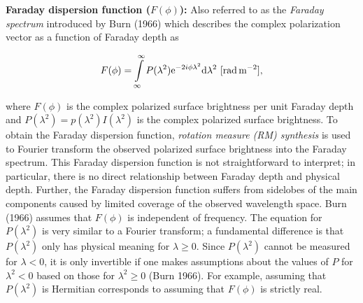 \documentclass[a4paper,10pt]{article}
\begin{document}
{\noindent}\textbf{Faraday dispersion function ($F(\phi)$):} Also referred to as the \textit{Faraday spectrum} introduced by Burn (1966) which describes the complex polarization vector as a function of Faraday depth as

\begin{align*}
    F(\phi) = \int\limits_{\infty}^\infty P(\lambda^2)\mathrm{e}^{-2i\phi\lambda^2}\mathrm{d}\lambda^2 ~ [{\rm rad\,m^{-2}}],
\end{align*}

{\noindent}where $F(\phi)$ is the complex polarized surface brightness per unit Faraday depth and $P(\lambda^2) = p(\lambda^2)I(\lambda^2)$ is the complex polarized surface brightness. To obtain the Faraday dispersion function, \textit{rotation measure (RM) synthesis} is used to Fourier transform the observed polarized surface brightness into the Faraday spectrum. This Faraday dispersion function is not straightforward to interpret; in particular, there is no direct relationship between Faraday depth and physical depth. Further, the Faraday dispersion function suffers from sidelobes of the main components caused by limited coverage of the observed wavelength space. Burn (1966) assumes that $F(\phi)$ is independent of frequency. The equation for $P(\lambda^2)$ is very similar to a Fourier transform; a fundamental difference is that $P(\lambda^2)$ only has physical meaning for $\lambda\geq0$. Since $P(\lambda^2)$ cannot be measured for $\lambda<0$, it is only invertible if one makes assumptions about the values of $P$ for $\lambda^2<0$ based on those for $\lambda^2\geq0$ (Burn 1966). For example, assuming that $P(\lambda^2)$ is Hermitian corresponds to assuming that $F(\phi)$ is strictly real.
\end{document}
